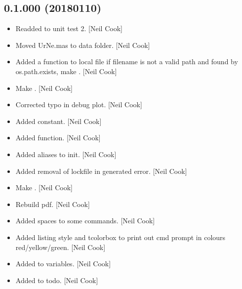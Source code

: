 \documentclass[a4paper,10pt,english]{report}
\begin{document}
\subsection{0.1.000 (2018\sphinxhyphen{}01\sphinxhyphen{}10)}
\label{\detokenize{misc/changelog:id523}}\begin{itemize}
\item {} 
Readded  to unit test 2. {[}Neil Cook{]}

\item {} 
Moved UrNe.mas to data folder. {[}Neil Cook{]}

\item {} 
Added a  function \sphinxhyphen{} to local file if filename is not a
valid path and found by os.path.exists, make  .
{[}Neil Cook{]}

\item {} 
Make  . {[}Neil Cook{]}

\item {} 
Corrected typo in debug plot. {[}Neil Cook{]}

\item {} 
Added  constant. {[}Neil Cook{]}

\item {} 
Added  function. {[}Neil Cook{]}

\item {} 
Added aliases to init. {[}Neil Cook{]}

\item {} 
Added removal of lockfile in generated error. {[}Neil Cook{]}

\item {} 
Make  . {[}Neil Cook{]}

\item {} 
Rebuild pdf. {[}Neil Cook{]}

\item {} 
Added spaces to some commands. {[}Neil Cook{]}

\item {} 
Added listing style and tcolorbox to print out cmd prompt in colours
red/yellow/green. {[}Neil Cook{]}

\item {} 
Added to variables. {[}Neil Cook{]}

\item {} 
Added to todo. {[}Neil Cook{]}


\end{itemize}
\end{document}
